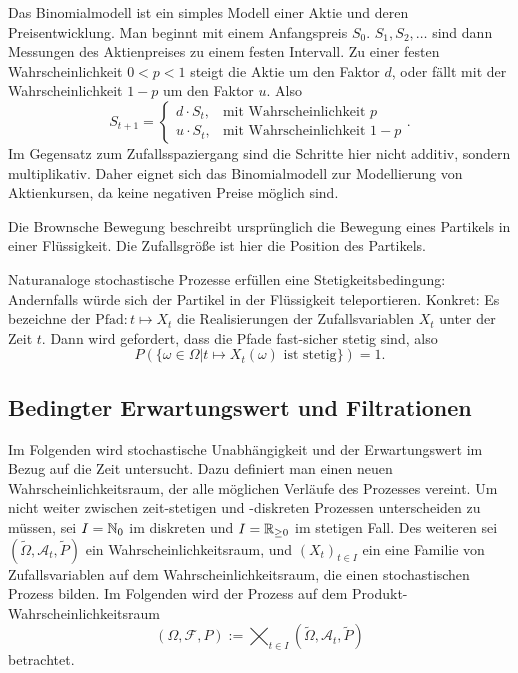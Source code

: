 \begin{bsp}[Binomialmodell]
Das Binomialmodell ist ein simples Modell einer Aktie und deren Preisentwicklung. 
Man beginnt mit einem Anfangspreis $S_0$. $S_1, S_2, \dots$ sind dann Messungen des Aktienpreises zu einem festen Intervall.
 Zu einer festen Wahrscheinlichkeit $0 \lt p \lt 1$ steigt die Aktie um den Faktor $d$, oder fällt mit der Wahrscheinlichkeit $1-p$ um den Faktor $u$. Also
$$S_{t+1} = \begin{cases} 
    d \cdot S_t, & \text{mit Wahrscheinlichkeit }  p \\ 
    u \cdot S_t, & \text{mit Wahrscheinlichkeit }  1-p

\end{cases}.$$
Im Gegensatz zum Zufallsspaziergang sind die Schritte hier nicht additiv, sondern multiplikativ. Daher
eignet sich das Binomialmodell zur Modellierung von Aktienkursen, da keine negativen Preise möglich sind.

\end{bsp}
\begin{bsp}
Die Brownsche Bewegung beschreibt ursprünglich die Bewegung eines Partikels in 
einer Flüssigkeit. Die Zufallsgröße ist hier die Position des Partikels.

Naturanaloge stochastische Prozesse erfüllen eine Stetigkeitsbedingung: 
Andernfalls würde sich der Partikel in der Flüssigkeit teleportieren. 
Konkret: Es bezeichne der $\text{Pfad}: t \mapsto X_t$ die Realisierungen der Zufallsvariablen $X_t$ unter 
der Zeit $t$. Dann wird gefordert, dass die Pfade fast-sicher stetig sind, also 
$$P(\{\omega \in \Omega | t \mapsto X_t(\omega) \text{ ist stetig}\}) = 1.$$ 
\end{bsp}

\subsection{Bedingter Erwartungswert und Filtrationen}

Im Folgenden wird stochastische Unabhängigkeit und der Erwartungswert im Bezug auf die Zeit untersucht. 
Dazu definiert man einen neuen Wahrscheinlichkeitsraum, 
der alle möglichen Verläufe des Prozesses vereint. 
Um nicht weiter zwischen zeit-stetigen und -diskreten Prozessen unterscheiden zu müssen, 
sei $I = \Bbb N_0$ im diskreten und $I = \Bbb R_{\ge 0}$ im stetigen Fall. 
Des weiteren sei $(\tilde \Omega, \mathcal A_t, \tilde P)$ ein Wahrscheinlichkeitsraum, 
und $(X_t)_{t \in I}$ ein eine Familie von Zufallsvariablen auf dem Wahrscheinlichkeitsraum, 
die einen stochastischen Prozess bilden. Im Folgenden wird der Prozess 
auf dem Produkt-Wahrscheinlichkeitsraum
$$(\Omega, \mathcal F, P) := \bigtimes_{t \in I}(\tilde \Omega, \mathcal A_t,\tilde P)$$
betrachtet.

